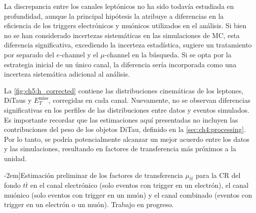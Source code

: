 La discrepancia entre los canales leptónicos no ha sido todavía estudiada en profundidad, aunque la principal hipótesis la atribuye a diferencias en la eficiencia de los triggers electrónicos y muónicos utilizados en el análisis. Si bien no se han considerado incertezas sistemáticas en las simulaciones de MC, esta diferencia significativa, excediendo la incerteza estadística, sugiere un tratamiento por separado del $e$-channel y el $\mu$-channel en la búsqueda. Si se opta por la estrategia inicial de un único canal, la diferencia sería incorporada como una incerteza sistemática adicional al análisis.

La \cref{fig:ch5:h_corrected} contiene las distribuciones cinemáticas de los leptones, DiTaus y $E_T^{\text{miss}}$, corregidas en cada canal. Nuevamente, no se observan diferencias significativas en los perfiles de las distribuciones entre datos y eventos simulados. Es importante recordar que las estimaciones aquí presentadas no incluyen las contribuciones del peso de los objetos DiTau, definido en la \cref{sec:ch4:processing}. Por lo tanto, se podría potencialmente alcanzar un mejor acuerdo entre los datos y las simulaciones, resultando en factores de transferencia más próximos a la unidad.

\begin{table}[bh!]
    \centering
    \small
    
    \caption[][-2em]{Estimación preliminar de los factores de transferencia $\mu_{t\bar{t}}$ para la CR del fondo $t\bar{t}$ en el canal electrónico (solo eventos con trigger en un electrón), el canal muónico (solo eventos con trigger en un muón) y el canal combinado (eventos con trigger en un electrón o un muón). Trabajo en progreso.}
    \label{tbl:ch5:ttbar_mu}
\end{table}

